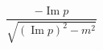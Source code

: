 \documentclass{minimal}
\renewcommand\Im{\operatorname{Im}}
\begin{document}
$$\frac{-\Im p}{\sqrt{(\Im p)^2 - m^2}}$$
\end{document}

